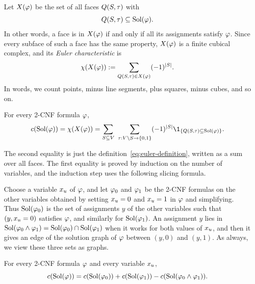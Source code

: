 Let \(X(\varphi)\) be the set of all faces \(Q(S,\tau)\) with
\[
  Q(S,\tau)\subseteq\operatorname{Sol}(\varphi).
\]
In other words, a face is in \(X(\varphi)\) if and only if all its assignments
satisfy \(\varphi\). Since every subface of such a face has the same property,
\(X(\varphi)\) is a finite cubical complex, and its \emph{Euler characteristic}
is
\begin{equation}\label{eq:euler-definition}
  \chi(X(\varphi))
  :=
  \sum_{Q(S,\tau)\in X(\varphi)}(-1)^{|S|}.
\end{equation}
In words, we count points, minus line segments, plus squares, minus cubes, and
so on.

\begin{lemma}\label{lem:euler-characteristic}
For every 2-CNF formula \(\varphi\),
\begin{equation}\label{eq:component-cancellation}
  \solcomp{\fml}
  =
  \euler{\cplx{\fml}}
  =
  \sum_{\freeset\subseteq \Vset}
  \ \sum_{\fixasg:\Vset\setminus \freeset\to\{0,1\}}
  (-1)^{|\freeset|}
  \1_{\{\face{\freeset}{\fixasg}\subseteq\Sol(\fml)\}}.
\end{equation}
\end{lemma}

The second equality is just the definition~\eqref{eq:euler-definition},
written as a sum over all faces. The first equality is proved by induction on
the number of variables, and the induction step uses the following slicing
formula.

Choose a variable \(x_{u}\) of \(\varphi\), and let \(\varphi_0\) and \(\varphi_1\)
be the 2-CNF formulas on the other variables obtained by setting
\(x_{u}=0\) and \(x_{u}=1\) in \(\varphi\) and simplifying. Thus
\(\operatorname{Sol}(\varphi_0)\) is the set of assignments \(y\) of the other variables such
that \((y,x_{u}=0)\) satisfies \(\varphi\), and similarly for
\(\operatorname{Sol}(\varphi_1)\). An assignment \(y\) lies in
\(\operatorname{Sol}(\varphi_0\wedge\varphi_1)=\operatorname{Sol}(\varphi_0)\cap\operatorname{Sol}(\varphi_1)\) when it works for both
values of \(x_{u}\), and then it gives an edge of the solution graph of
\(\varphi\) between \((y,0)\) and \((y,1)\). As always, we view these three sets
as graphs.

\begin{lemma}\label{lem:slice-components}
For every 2-CNF formula \(\varphi\) and every variable \(x_{u}\),
\begin{equation}\label{eq:slice-components}
  c(\operatorname{Sol}(\varphi))=c(\operatorname{Sol}(\varphi_0))+c(\operatorname{Sol}(\varphi_1))-c(\operatorname{Sol}(\varphi_0\wedge\varphi_1)).
\end{equation}
\end{lemma}

